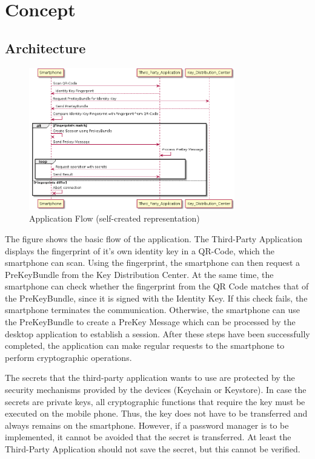 \documentclass[12pt,oneside,a4paper,parskip]{scrbook}
\begin{document}
\chapter{Concept}

\section{Architecture}
\label{sec:architecture}
\begin{figure}[ht]
	\centering
  \includegraphics[width=0.8\textwidth]{ressources/process_flow.png}
  \caption{Application Flow (self-created representation)}
  \label{fig:app_flo}
\end{figure}
The figure shows the basic flow of the application. The Third-Party Application displays the fingerprint of it's own identity key in a QR-Code, which the smartphone can scan. Using the fingerprint, the smartphone can then request a PreKeyBundle from the Key Distribution Center. At the same time, the smartphone can check whether the fingerprint from the QR Code matches that of the PreKeyBundle, since it is signed with the Identity Key. If this check fails, the smartphone terminates the communication. Otherwise, the smartphone can use the PreKeyBundle to create a PreKey Message which can be processed by the desktop application to establish a session. After these steps have been successfully completed, the application can make regular requests to the smartphone to perform cryptographic operations. 

The secrets that the third-party application wants to use are protected by the security mechanisms provided by the devices (Keychain or Keystore).
In case the secrets are private keys, all cryptographic functions that require the key must be executed on the mobile phone. Thus, the key does not have to be transferred and always remains on the smartphone. However, if a password manager is to be implemented, it cannot be avoided that the secret is transferred. 
At least the Third-Party Application should not save the secret, but this cannot be verified.
\end{document}
